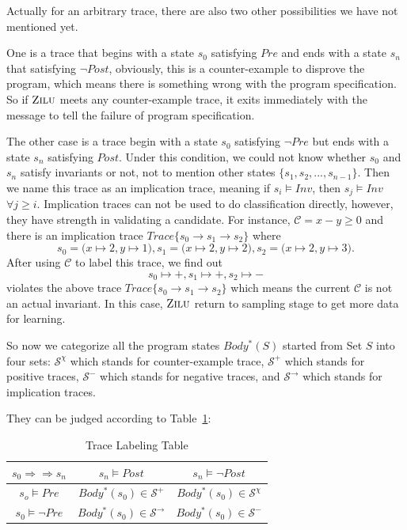 Actually for an arbitrary trace, there are also two other possibilities we have not mentioned yet.

One is a trace that begins with a state $s_0$ satisfying $Pre$ and ends with a state $s_n$ that satisfying $\neg Post$,
obviously, this is a counter-example to disprove the program,
which means there is something wrong with the program specification.
So if $\textsc{Zilu}$ meets any counter-example trace, 
it exits immediately with the message to tell the failure of program specification. 

The other case is a trace begin with a state $s_0$ satisfying $\neg Pre$ but ends with a state $s_n$ satisfying $Post$.
Under this condition, we could not know whether $s_0$ and $s_n$ satisfy invariants or not,
not to mention other states $\{s_1, s_2, ..., s_{n-1}\}$.
Then we name this trace as an implication trace, meaning if $s_i \models Inv$, then $s_j \models Inv$ $\forall j \ge i$.
Implication traces can not be used to do classification directly, 
however, they have strength in validating a candidate.
For instance, $\mathcal{C} = x - y \ge 0$ and there is an implication trace 
$Trace\{s_0 \to s_1 \to s_2\}$ where 
$$s_0 = \big(x \mapsto 2, y \mapsto 1\big),  s_1 = \big(x \mapsto 2, y \mapsto 2\big),  s_2 = \big(x \mapsto 2, y \mapsto 3\big).$$
After using $\mathcal{C}$ to label this trace, we find out $$s_0 \mapsto +,  s_1 \mapsto +,  s_2 \mapsto -$$ 
violates the above trace $Trace\{s_0 \to s_1 \to s_2\}$ which means the current $\mathcal{C}$ is not an actual invariant.
In this case, $\textsc{Zilu}$ return to sampling stage to get more data for learning.


So now we categorize all the program states $Body^*(S)$ started from Set $S$ into four sets:
$\mathcal{S}^\chi$ which stands for counter-example trace, 
$\mathcal{S}^+$ which stands for positive traces, 
$\mathcal{S}^-$ which stands for negative traces, 
and $\mathcal{S}^\rightarrow$ which stands for implication traces.

They can be judged according to Table~\ref{tab:labeling}: 
\begin{table}[htb]
\label{tab:labeling}
\centering
\begin{tabular}[float]{|c|c|c|}
\hline
$s_0 \Rightarrow \Rightarrow s_n$ & $s_n \models Post$            & $s_n \models \neg Post$\\
\hline
$s_o \models Pre$                 & $Body^*(s_0) \in \mathcal{S}^+$       & $Body^*(s_0) \in \mathcal{S}^\chi$\\
\hline
$s_0 \models \neg Pre$            & $Body^*(s_0) \in \mathcal{S}^\rightarrow$       & $Body^*(s_0) \in \mathcal{S}^-$\\
\hline
\end{tabular}
\caption{Trace Labeling Table}
\end{table}

